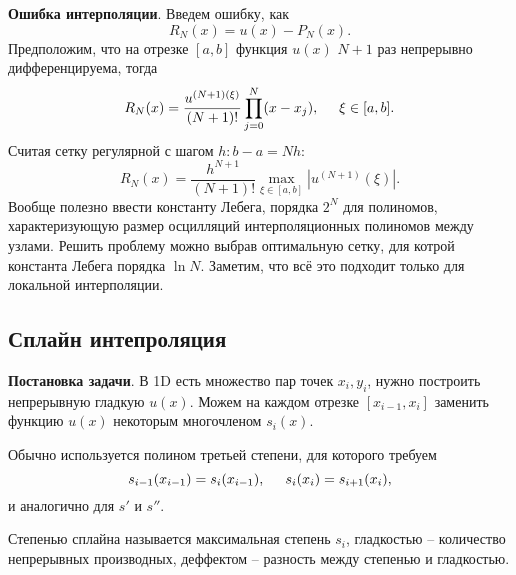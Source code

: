 \textbf{Ошибка интерполяции}. Введем ошибку, как
\begin{equation*}
	R_N (x)= u(x) - P_N (x).
\end{equation*}
Предположим, что на отрезке $[a, b]$ функция $u(x)$ $N+1$ раз непрерывно дифференцируема, тогда
\begin{equation*}
	R_N (x) = \frac{u^{(N+1) (\xi)}}{(N+1)!} \prod_{j=0}^{N} (x-x_j),
	\hspace{5 mm} 
	\xi \in [a, b].
\end{equation*}
Считая сетку регулярной с шагом $h \colon  b-a = N h$:
\begin{equation*}
	R_N (x) = \frac{h^{N+1}}{(N+1)!} \max_{\xi \in [a, b]} |u^{(N+1)} (\xi)|.
\end{equation*}
Вообще полезно ввести константу Лебега, порядка $2^N$ для полиномов, характеризующую размер осцилляций интерполяционных полиномов между узлами.
Решить проблему можно выбрав оптимальную сетку, для котрой константа Лебега порядка $\ln N$. Заметим, что всё это подходит только для локальной интерполяции. 




\subsection*{Сплайн интепроляция}


\textbf{Постановка задачи}. В 1D есть множество пар точек ${x_i, y_i}$, нужно построить непрерывную гладкую $u(x)$.  Можем на каждом отрезке $[x_{i-1}, x_i]$ заменить функцию $u(x)$ некоторым многочленом $s_i (x)$. 


Обычно используется полином третьей степени, для которого требуем
\begin{equation*}
	s_{i-1} (x_{i-1}) = s_{i} (x_{i-1}),
	\hspace{5 mm} 
	s_{i} (x_i) = s_{i+1} (x_i),
\end{equation*}
и аналогично для $s'$ и $s''$.

Степенью сплайна называется максимальная степень $s_i$, гладкостью -- количество непрерывных производных, деффектом -- разность между степенью и гладкостью. 


